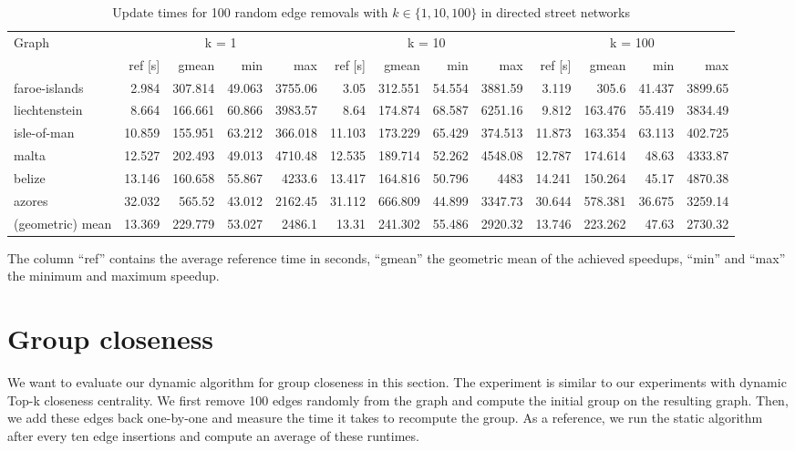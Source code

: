 \begin{landscape}
\begin{table}[h!]
\centering
\begin{tabular}{l|rrrr|rrrr|rrrr}
\toprule
Graph & \multicolumn{4}{c|}{k = 1} & \multicolumn{4}{c|}{k = 10} & \multicolumn{4}{c}{k = 100}\\
                &     ref [s] &   gmean &   min &     max &     ref [s] &   gmean &   min &     max &     ref [s] &   gmean &   min &     max \\
\midrule \midrule
 faroe-islands    &  2.984 & 307.814 & 49.063 & 3755.06  &  3.05  & 312.551 & 54.554 & 3881.59  &  3.119 & 305.6   & 41.437 & 3899.65  \\
 liechtenstein    &  8.664 & 166.661 & 60.866 & 3983.57  &  8.64  & 174.874 & 68.587 & 6251.16  &  9.812 & 163.476 & 55.419 & 3834.49  \\
 isle-of-man      & 10.859 & 155.951 & 63.212 &  366.018 & 11.103 & 173.229 & 65.429 &  374.513 & 11.873 & 163.354 & 63.113 &  402.725 \\
 malta            & 12.527 & 202.493 & 49.013 & 4710.48  & 12.535 & 189.714 & 52.262 & 4548.08  & 12.787 & 174.614 & 48.63  & 4333.87  \\
 belize           & 13.146 & 160.658 & 55.867 & 4233.6   & 13.417 & 164.816 & 50.796 & 4483     & 14.241 & 150.264 & 45.17  & 4870.38  \\
 azores           & 32.032 & 565.52  & 43.012 & 2162.45  & 31.112 & 666.809 & 44.899 & 3347.73  & 30.644 & 578.381 & 36.675 & 3259.14  \\ \midrule \midrule
 (geometric) mean & 13.369 & 229.779 & 53.027 & 2486.1   & 13.31  & 241.302 & 55.486 & 2920.32  & 13.746 & 223.262 & 47.63  & 2730.32  \\
\bottomrule
\end{tabular}
\caption{Update times for 100 random edge removals with  $k \in \{1, 10, 100\}$ in directed street networks}{The column ``ref'' contains the average reference time in seconds, ``gmean'' the geometric mean of the achieved speedups, ``min'' and ``max'' the minimum and maximum speedup.}
\label{tbl:removalsDirectedStreet}
\end{table}

\end{landscape}


\section{Group closeness}
We want to evaluate our dynamic algorithm for group closeness in this section. The experiment is similar to our experiments with dynamic Top-k closeness centrality. We first remove 100 edges randomly from the graph and compute the initial group on the resulting graph. Then, we add these edges back one-by-one and measure the time it takes to recompute the group. As a reference, we run the static algorithm after every ten edge insertions and compute an average of these runtimes.

